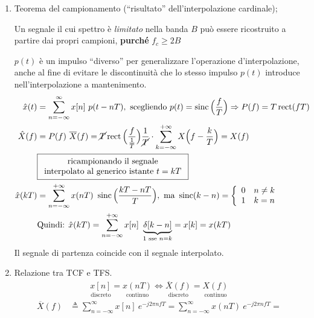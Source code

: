 \documentclass[
]{article}
\begin{document}
\begin{enumerate}
\def\labelenumi{\arabic{enumi}.}
\setcounter{enumi}{10}
\item
  Teorema del campionamento (``risultato'' dell'interpolazione
  cardinale);

  Un segnale il cui spettro è \emph{limitato} nella banda \(B\) può
  essere ricostruito a partire dai propri campioni, \textbf{purché}
  \(f_c \geq 2B\)

  \(p(t)\) è un impulso ``diverso'' per generalizzare l'operazione
  d'interpolazione, anche al fine di evitare le discontinuità che lo
  stesso impulso \(p(t)\) introduce nell'interpolazione a mantenimento.
  \begin{align*}
  \hat{x}(t)&= \sum_{n=-\infty}^{\infty} x[n] \ p(t-nT), \ \text{scegliendo } p(t)= \mathop{\mathrm{sinc}}\Big(\frac{f}{T}\Big) \Rightarrow P(f)=T\mathop{\mathrm{rect}}(fT) \\ 
  \hat{X}(f)&= P(f) \ \overline{X}(f) = \cancel{T}\mathop{\mathrm{rect}}\Big(\frac{f}{\frac{1}{T}}\Big)\frac{1}{\cancel{T}}\cdot  \sum_{k=-\infty}^{+\infty} X\Big(f-\frac{k}{T}\Big)= X(f) \\
     &\boxed{\begin{array}{cl}
    \text{ricampionando il segnale}
    \\
     \text{interpolato al generico istante } t=kT
    \end{array}}&
    \\
  \hat{x}(kT) &=\sum_{n=-\infty}^{+\infty} x(nT) \ \mathop{\mathrm{sinc}}\Big(\frac{kT-nT}{T}\Big), \text{ ma } \mathop{\mathrm{sinc}}(k-n)=
  \left\{ \begin{array}{cl}
  0 & n\neq k \\
  1 & k=n
  \end{array} 
  \right. \\
  &\text{Quindi: } \hat{x}(kT)=\sum_{n=-\infty}^{+\infty}x[n] \ \underbrace{\delta[k-n]}_{1\text{ sse }n=k}= x[k] = x(kT)
  \end{align*} Il segnale di partenza coincide con il segnale
  interpolato.
\item
  Relazione tra TCF e TFS. \begin{align*}
  \underset{\text{discreto}}{x[n]}=\underset{\text{continuo}}{x(nT)} \Longleftrightarrow \underset{\text{discreto}}{\overline{X}(f)} = \underset{\text{continuo}}{X(f)}
  \end{align*} \begin{align*}
  \overline{X}(f) &\triangleq \sum_{n=-\infty}^{\infty} x[n] \ e^{-j2\pi nfT} = \sum_{n=-\infty}^{\infty} x(nT) \ e^{-j2\pi nfT}=

\end{align*}
\end{enumerate}
\end{document}
